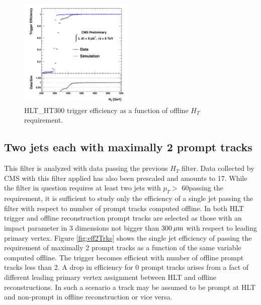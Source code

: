 \begin{figure}[htbp]
\centering
 \includegraphics[width=0.49\textwidth]{plots/trigger/effHT300.pdf}
\caption{HLT\_HT300 trigger efficiency as a function of offline $H_T$ requirement. \label{fig:effHT300}}
\end{figure} 

\subsection{Two jets each with maximally 2 prompt tracks}
\label{subsec:trig2Trks}

This filter is analyzed with data passing the previous 
$H_T$ filter. Data collected by CMS with this filter applied has also been prescaled and 
amounts to 17\pbinv.  
While the filter in question
 requires at least two jets with $p_T>$ 60\GeV passing the requirement, it is sufficient to study
 only the efficiency
 of a single jet passing the filter with respect to number of prompt tracks computed offline.
 In both HLT trigger and offline
 reconstruction prompt tracks are selected as those with an impact parameter in 3 dimensions 
not bigger than 300$\,\mu\text{m}$
 with respect to leading primary vertex. Figure \ref{fig:eff2Trks} shows the single jet efficiency of passing
 the requirement of maximally 2 prompt tracks as a function of the same variable computed offline.
 The trigger becomes efficient with number of offline prompt tracks less than 2. 
A drop in efficiency for 0 prompt tracks arises from a fact of different leading primary vertex assignment 
between HLT and offline reconstructions. 
In such a scenario a track may be assumed to be prompt at HLT and non-prompt
 in offline reconstruction or vice versa. 
  

